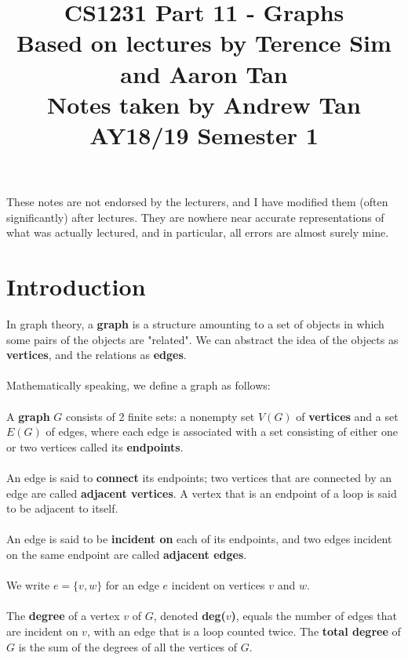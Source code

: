\documentclass[a4paper]{article}
\title{%
	CS1231 Part 11 - Graphs  \\
	\large Based on lectures by Terence Sim and Aaron Tan
	\\ Notes taken by Andrew Tan
	\\ AY18/19 Semester 1
	\\ }
\author{}
\date{\vspace{-5ex}}
\begin{document}
\maketitle

\begin{center}\begin{minipage}[c]{0.9\textwidth}\centering\footnotesize These notes are not endorsed by the lecturers, and I have modified them (often significantly) after lectures. They are nowhere near accurate representations of what was actually lectured, and in particular, all errors are almost surely mine.\end{minipage}\end{center}

\section{Introduction}
In graph theory, a \textbf{graph} is a structure amounting to a set of objects in which some pairs of the objects are "related". We can abstract the idea of the objects as \textbf{vertices}, and the relations as \textbf{edges}.\\\\
Mathematically speaking, we define a graph as follows:\\\\
A \textbf{graph} $G$ consists of 2 finite sets: a nonempty set $V(G)$ of \textbf{vertices} and a set $E(G)$ of edges, where each edge is associated with a set consisting of either one or two vertices called its \textbf{endpoints}.\\\\
An edge is said to \textbf{connect} its endpoints; two vertices that are connected by an edge are called \textbf{adjacent vertices}. A vertex that is an endpoint of a loop is said to be adjacent to itself.\\\\
An edge is said to be \textbf{incident on} each of its endpoints, and two edges incident on the same endpoint are called \textbf{adjacent edges}.\\\\
We write $e=\{v,w\}$ for an edge $e$ incident on vertices $v$ and $w$.\\\\
The \textbf{degree} of a vertex $v$ of $G$, denoted \textbf{deg($v$)}, equals the number of edges that are incident on $v$, with an edge that is a loop counted twice. The \textbf{total degree} of $G$ is the sum of the degrees of all the vertices of $G$.\\\\
\end{document}
